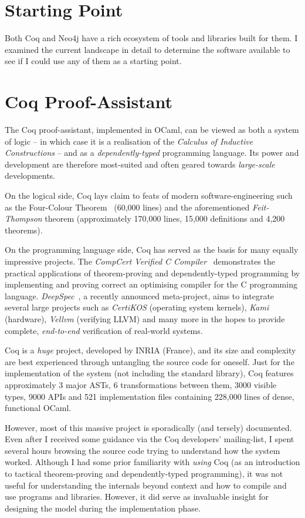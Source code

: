 \section{Starting Point}

Both Coq and Neo4j have a rich ecosystem of tools and libraries built for them.
I examined the current landscape in detail to determine the software available
to see if I could use any of them as a starting point.

\section{Coq Proof-Assistant}

The Coq proof-assistant, implemented in OCaml, can be viewed as both a system of
logic -- in which case it is a realisation of the \emph{Calculus of Inductive
Constructions} -- and as a \emph{dependently-typed} programming language. Its
power and development are therefore most-suited and often geared towards
\emph{large-scale} developments.

On the logical side, Coq lays claim to feats of modern software-engineering such
as the Four-Colour Theorem~\cite{gonthier2008formal} (60,000 lines) and the
aforementioned \emph{Feit-Thompson} theorem (approximately 170,000 lines, 15,000
definitions and 4,200 theorems).

On the programming language side, Coq has served as the basis for many equally
impressive projects. The \emph{CompCert Verified C
Compiler}~\cite{leroy2012compcert} demonstrates the practical applications of
theorem-proving and dependently-typed programming by implementing and proving
correct an optimising compiler for the C programming language.
\emph{DeepSpec}~\cite{pierce2016science}, a recently announced meta-project,
aims to integrate several large projects such as \emph{CertiKOS} (operating
system kernels), \emph{Kami} (hardware), \emph{Vellvm} (verifying LLVM) and many
more in the hopes to provide complete, \emph{end-to-end} verification of
real-world systems.

Coq is a \emph{huge} project, developed by INRIA (France), and its size and
complexity are best experienced through untangling the source code for oneself.
Just for the implementation of the system (not including the standard library),
Coq features approximately 3 major ASTs, 6 transformations between them, 3000
visible types, 9000 APIs and 521 implementation files containing 228,000 lines
of dense, functional OCaml.

However, most of this massive project is sporadically (and tersely) documented.
Even after I received some guidance via the Coq developers' mailing-list, I
spent several hours browsing the source code trying to understand how the system
worked. Although I had some prior familiarity with \emph{using} Coq (as an
introduction to tactical theorem-proving and dependently-typed programming), it
was not useful for understanding the internals beyond context and how to compile
and use programs and libraries. However, it did serve as invaluable insight for
designing the model during the implementation phase.

